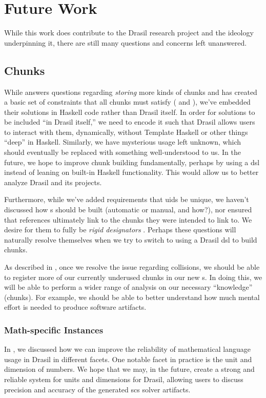 \chapter{Future Work}
\label{chap:futureWork}

While this work does contribute to the Drasil research project and the ideology
underpinning it, there are still many questions and concerns left unanswered.

\section{Chunks}

While  answers questions regarding \textit{storing}
more kinds of chunks and has created a basic set of constraints that all chunks
must satisfy (\HasUID{} and \HasChunkRefs{}), we've embedded their solutions in
Haskell code rather than Drasil itself. In order for solutions to be included
``in Drasil itself,'' we need to encode it such that Drasil allows users to
interact with them, dynamically, without Template Haskell  or other things ``deep'' in Haskell. Similarly, we have
mysterious \Typeable{} usage left unknown, which should eventually be replaced
with something well-understood to us. In the future, we hope to improve chunk
building fundamentally, perhaps by using a \acs{dsl} instead of leaning on
built-in Haskell functionality. This would allow us to better analyze Drasil and
its projects.

Furthermore, while we've added requirements that \acsp{uid} be unique, we
haven't discussed how \UID{}s should be built (automatic or manual, and how?),
nor ensured that \UID{} references ultimately link to the chunks they were
intended to link to. We desire for them to fully be \textit{rigid designators}
. Perhaps these questions will
naturally resolve themselves when we try to switch to using a Drasil \acs{dsl}
to build chunks.

As described in , once we resolve the issue regarding
\UID{} collisions, we should be able to register more of our currently underused
chunks in our new \ChunkDB{}s. In doing this, we will be able to perform a wider
range of analysis on our necessary ``knowledge'' (chunks). For example, we
should be able to better understand how much mental effort is needed to produce
software artifacts.

\subsection{Math-specific Instances}

In , we discussed how we can improve the
reliability of mathematical language usage in Drasil in different facets. One
notable facet in practice is the unit and dimension of numbers. We hope that we
may, in the future, create a strong and reliable system for units and dimensions
for Drasil, allowing users to discuss precision and accuracy of the generated
\acs{scs} solver artifacts.
